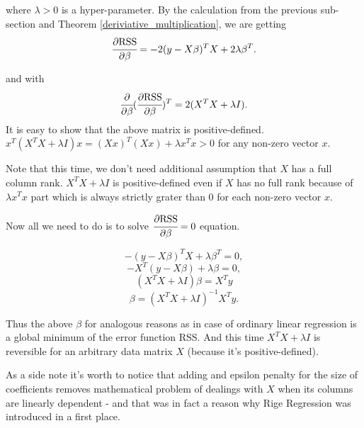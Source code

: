 \documentclass[main.tex]{subfiles}
\begin{document}
where $\lambda > 0$ is a hyper-parameter.
By the calculation from the previous sub-section and Theorem \ref{deriviative_multiplication}, we are getting
\begin{equation}
    \cfrac{\partial \text{RSS}}{\partial \beta} = -2(y - X\beta)^T X + 2\lambda\beta^T.
\end{equation}

and with 
\begin{equation}
     \cfrac{\partial}{\partial \beta}(\cfrac{\partial \text{RSS}}{\partial \beta})^T
     = 2(X^T X + \lambda I).
\end{equation}
It is easy to show that the above matrix is positive-defined. 
$x^T(X^T X + \lambda I)x = (Xx)^T(Xx) + \lambda x^T x > 0$ for any non-zero vector $x$.

Note that this time, we don't need additional assumption that $X$ has a full column rank. $X^T X + \lambda I$ is positive-defined even if $X$ has no full rank because of $\lambda x^T x$ part which is always strictly grater than 0 for each non-zero vector $x$.

Now all we need to do is to solve $\cfrac{\partial \text{RSS}}{\partial \beta} = 0$ equation.

\begin{equation}
    -(y - X\beta)^T X + \lambda \beta^T = 0,
\end{equation}
\begin{equation}
    - X^T (y - X\beta) + \lambda \beta = 0,
\end{equation}
\begin{equation}
    (X^T X + \lambda I)\beta = X^T y
\end{equation}
\begin{equation}
    \beta = (X^T X + \lambda I)^{-1} X^T y.
\end{equation}

Thus the above $\beta$ for analogous reasons as in case of ordinary linear regression is a global minimum of the error function RSS. And this time $X^T X + \lambda I$ is reversible for an arbitrary data matrix $X$ (because it's positive-defined).

\indent

As a side note it's worth to notice that adding and epsilon penalty for the size of coefficients removes mathematical problem of dealings with $X$ when its columns are linearly dependent - and that was in fact a reason why Rige Regression was introduced in a first place. 
\end{document}

